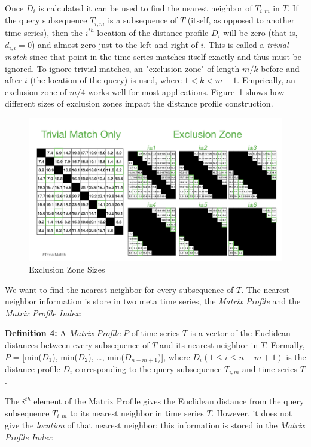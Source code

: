 \documentclass[conference]{IEEEtran}
\begin{document}
Once $D_i$ is calculated it can be used to find the nearest neighbor of $T_{i,m}$ in $T$.  If the query subsequence $T_{i,m}$ is a subsequence of $T$ (itself, as opposed to another time series), then the $i^{th}$ location of the distance profile $D_i$ will be zero (that is, $d_{i,i} = 0$) and almost zero just to the left and right of $i$.  This is called a \emph{trivial match} since that point in the time series matches itself exactly and thus must be ignored.  To ignore trivial matches, an "exclusion zone" of length $m/k$ before and after $i$ (the location of the query) is used, where $1 < k < m-1$.  Emprically, an exclusion zone of $m/4$ works well for most applications.  Figure~\ref{fig:ExclusionZone} shows how different sizes of exclusion zones impact the distance profile construction\cite{Stumpy}.

\begin{figure}
\begin{center}
\includegraphics[scale=0.25]{exclusion_zone.jpg}
\caption{Exclusion Zone Sizes}
\label{fig:ExclusionZone}
\end{center}
\end{figure}

We want to find the nearest neighbor for every subsequence of $T$.  The nearest neighbor information is store in two meta time series, the \emph{Matrix Profile} and the \emph{Matrix Profile Index}:

\textbf{Definition 4:} A \emph{Matrix Profile} $P$ of time series $T$ is a vector of the Euclidean distances between every subsequence of $T$ and its nearest neighbor in $T$.  Formally, $P$ = [min($D_1$), min($D_2$), \ldots{}, min($D_{n-m+1}$)], where $D_i(1 \leq i \leq n-m+1)$ is the distance profile $D_i$ corresponding to the query subsequence $T_{i,m}$ and time series $T$.

The $i^{th}$ element of the Matrix Profile gives the Euclidean distance from the query subsequence $T_{i,m}$ to its nearest neighbor in time series $T$.  However, it does not give the \emph{location} of that nearest neighbor; this information is stored in the \emph{Matrix Profile Index}:
\end{document}
